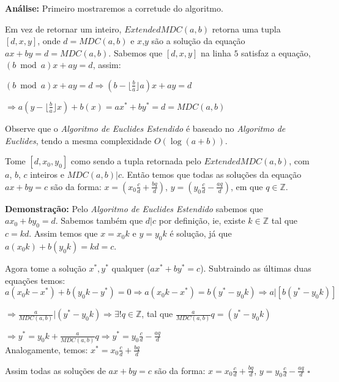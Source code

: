 \textbf{Análise:}
Primeiro mostraremos a corretude do algoritmo.

Em vez de retornar um inteiro, $ExtendedMDC(a,b)$ retorna uma tupla $[d,x,y]$, onde $d=MDC(a,b)$ e $x$,$y$ são a solução da equação $ax+by=d=MDC(a,b)$.
Sabemos que $[d,x,y]$ na linha $5$ satisfaz a equação, $(b\bmod a)x + ay = d$, assim:

$(b\bmod a)x + ay = d \Rightarrow (b - \lfloor \frac{b}{a} \rfloor a)x + ay = d$

$\Rightarrow a(y-\lfloor \frac{b}{a} \rfloor x) + b(x) = ax^* + by^* = d = MDC(a,b)$

Observe que o \textit{Algoritmo de Euclides Estendido} é baseado no \textit{Algoritmo de Euclides}, tendo a mesma complexidade $O(\log(a+b))$.
\\


\begin{corollary}\label{mdc_extended_solutions}
Tome $[d,x_0,y_0]$ como sendo a tupla retornada pelo $ExtendedMDC(a,b)$, com $a$, $b$, $c$ inteiros e $MDC(a,b)|c$.
Então temos que todas as soluções da equação $ax+by=c$ são da forma: $x=(x_0\frac{c}{d} + \frac{bq}{d})$, $y=(y_0\frac{c}{d} - \frac{aq}{d})$, em que $q\in\mathbb{Z}$.
\end{corollary}
\textbf{Demonstração:}
Pelo \textit{Algoritmo de Euclides Estendido} sabemos que $ax_0 + by_0=d$. Sabemos também que $d|c$ por definição, ie, existe $k\in\mathbb{Z}$ tal que $c=kd$.
Assim temos que $x=x_0k$ e $y=y_0k$ é solução, já que $a(x_0k)+b(y_0k) = kd = c$. 

Agora tome a solução $x^*,y^*$ qualquer ($ax^*+by^*=c$). Subtraindo as últimas duas equações temos:
\\

$a(x_0k-x^*) + b(y_0k-y^*) = 0 \Rightarrow a(x_0k-x^*) = b(y^* - y_0k) \Rightarrow a|[b(y^* - y_0k)]$

$\Rightarrow \frac{a}{MDC(a,b)}|(y^* - y_0k) \Rightarrow \exists! q\in\mathbb{Z}$, tal que $\frac{a}{MDC(a,b)}q = (y^* - y_0k)$

$\Rightarrow y^* = y_0k + \frac{a}{MDC(a,b)}q \Rightarrow y^* = y_0\frac{c}{d} - \frac{aq}{d}$
\\

Analogamente, temos: $x^* = x_0\frac{c}{d} + \frac{bq}{d}$

Assim todas as soluções de $ax+by=c$ são da forma:
$x = x_0\frac{c}{d} + \frac{bq}{d}$, $y = y_0\frac{c}{d} - \frac{aq}{d}$ $\square$
\\



